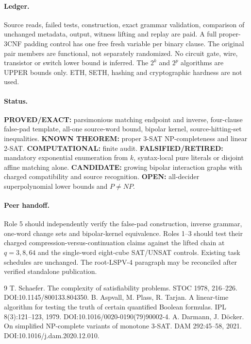 \documentclass[11pt]{article}
\begin{document}
\paragraph{Ledger.}
Source reads, failed tests, construction, exact grammar validation, comparison of unchanged metadata, output, witness lifting and replay are paid. A full proper-3CNF padding control has one free fresh variable per binary clause. The original pair members are functional, not separately randomized. No circuit gate, wire, transistor or switch lower bound is inferred. The $2^k$ and $2^p$ algorithms are UPPER bounds only. ETH, SETH, hashing and cryptographic hardness are not used.
\paragraph{Status.}
\textbf{PROVED/EXACT:} parsimonious matching endpoint and inverse, four-clause false-pad template, all-one source-word bound, bipolar kernel, source-hitting-set inequalities. \textbf{KNOWN THEOREM:} proper 3-SAT NP-completeness and linear 2-SAT. \textbf{COMPUTATIONAL:} finite audit. \textbf{FALSIFIED/RETIRED:} mandatory exponential enumeration from $k$, syntax-local pure literals or disjoint affine matching alone. \textbf{CANDIDATE:} growing bipolar interaction graphs with charged compatibility and source recognition. \textbf{OPEN:} all-decider superpolynomial lower bounds and $P\ne NP$.
\paragraph{Peer handoff.}
Role 5 should independently verify the false-pad construction, inverse grammar, one-word change sets and bipolar-kernel equivalence. Roles 1--3 should test their charged compression-versus-continuation claims against the lifted chain at $q=3,8,64$ and the single-word eight-cube SAT/UNSAT controls. Existing task schedules are unchanged. The root-LSPV-4 paragraph may be reconciled after verified standalone publication.
\begin{thebibliography}{9}
 T. Schaefer. The complexity of satisfiability problems. STOC 1978, 216--226. DOI:10.1145/800133.804350.
 B. Aspvall, M. Plass, R. Tarjan. A linear-time algorithm for testing the truth of certain quantified Boolean formulas. IPL 8(3):121--123, 1979. DOI:10.1016/0020-0190(79)90002-4.
 A. Darmann, J. D\"ocker. On simplified NP-complete variants of monotone 3-SAT. DAM 292:45--58, 2021. DOI:10.1016/j.dam.2020.12.010.
\end{thebibliography}
\end{document}
